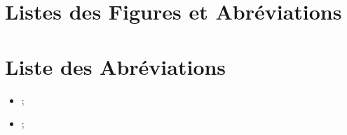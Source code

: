 \section*{Listes des Figures et Abréviations}
\renewcommand{\listfigurename}{Listes des Figures}
	\listoffigures
	
\section*{Liste des Abréviations}
	\begin{spacing}{1.2}
	\begin{itemize}
	\item	;
	\item ;
	\end{itemize}
	\end{spacing}